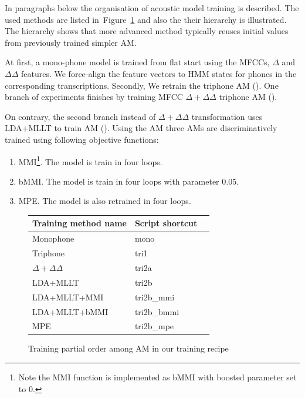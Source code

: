 In paragraphs below the organisation of acoustic model training is described. 
The used methods are listed in~Figure~\ref{fig:am-deps} and also the their hierarchy is illustrated.
The hierarchy shows that more advanced method typically reuses initial values from previously trained simpler \ac{AM}.

At first, a mono-phone model is trained from flat start using the MFCCs, $\Delta$ and $\Delta \Delta$ features.
We force-align the feature vectors to HMM states for phones in the corresponding transcriptions.
Secondly, We retrain the triphone \ac{AM} ().
One branch of experiments finishes by training \ac{MFCC} $\Delta + \Delta\Delta$ triphone \ac{AM} (). %

On contrary, the second branch instead of $\Delta + \Delta\Delta$ transformation uses \ac{LDA}+\ac{MLLT} to train \ac{AM} ().
Using the \ac{AM}  three \acp{AM} are discriminatively trained using following objective functions:
\begin{enumerate}
    \item \acl{MMI}\cite{chow1990maximum}\footnote{Note the \ac{MMI} function is implemented as \acs{bMMI} with boosted parameter set to 0.}. The model is train in four loops.
    \item \acl{bMMI}\cite{povey2008boosted}. The model  is train in four loops with parameter 0.05.
    \item \acl{MPE}\cite{povey2003mmi}. The model  is also retrained in four loops.
\end{enumerate}

\begin{figure}[!htp]
    \begin{center}
    
    \small{\begin{tabular}{lll}
    \hline
    Training method name & Script shortcut \\
    \hline
    Monophone & mono \\
    Triphone  & tri1 \\
    $\Delta + \Delta\Delta$ & tri2a  \\
    \acs{LDA}+\acs{MLLT} & tri2b  \\
    \acs{LDA}+\acs{MLLT}+\acs{MMI} & tri2b\_mmi \\
    \acs{LDA}+\acs{MLLT}+\acs{bMMI} & tri2b\_bmmi \\
    \acs{MPE} & tri2b\_mpe \\
    \hline
    \end{tabular}}
    \end{center}
    \caption{Training partial order among \ac{AM} in our training recipe}
    \label{fig:am-deps} 
\end{figure}

